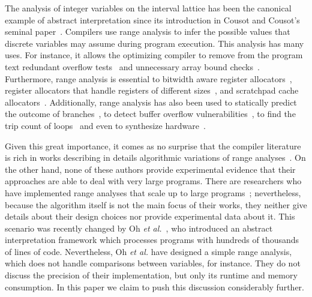 \documentclass[preprint]{elsarticle}
\begin{document}
The analysis of integer variables on the interval lattice has been the
canonical example of abstract interpretation since its introduction in
Cousot and Cousot's seminal paper~\cite{Cousot77}.
Compilers use range analysis to infer the possible values that discrete
variables may assume during program execution.
This analysis has many uses.
For instance, it allows the optimizing compiler to remove from the program text
redundant overflow tests~\cite{Sol11} and unnecessary array bound
checks~\cite{Bodik00,Gampe11}.
Furthermore, range analysis is essential to bitwidth aware register
allocators~\cite{Barik06,Tallam03}, register allocators that handle registers of
different sizes~\cite{Kong98,Pereira08,Scholz02}, and scratchpad cache
allocators~\cite{Yanqin11}.
Additionally, range analysis has also been used to statically predict the
outcome of branches~\cite{Patterson95}, to detect buffer overflow
vulnerabilities~\cite{Simon08,Wagner00}, to find the trip count of
loops~\cite{Lokuciejewski09}
and even to synthesize hardware~\cite{Cong05,Lhairech10,Mahlke01}.

Given this great importance, it comes as no surprise that the compiler
literature is rich in works describing in details algorithmic variations of
range analyses~\cite{Mahlke01,Gawlitza09,Stephenson00,Su05}.
On the other hand, none of these authors provide experimental evidence that
their approaches are able to deal with very large programs.
There are researchers who have implemented range analyses that scale up to
large programs~\cite{Patterson95,Blanchet03,Venet04}; nevertheless, because the
algorithm itself is not the main focus of their works, they neither give
details about their design choices nor provide experimental data about it.
This scenario was recently changed by Oh {\em et al.}~\cite{Oh12}, who
introduced an abstract interpretation framework which processes programs with
hundreds of thousands of lines of code.
Nevertheless, Oh {\em et al.} have designed a simple range analysis,
which does not handle comparisons between variables, for instance.
They do not discuss the precision of their implementation, but only its
runtime and memory consumption.
In this paper we claim to push this discussion considerably further.
\end{document}
